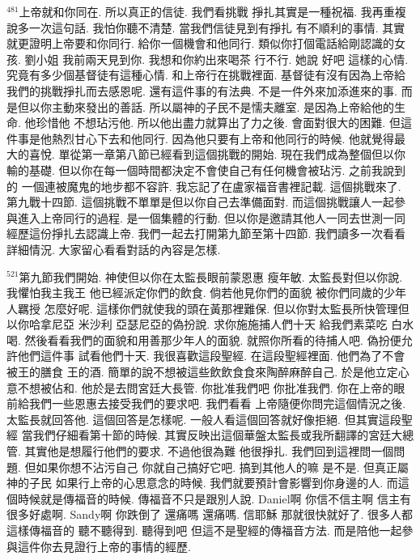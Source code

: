 \documentclass{book}
\begin{document}
$^{481}$上帝就和你同在.
所以真正的信徒.
我們看挑戰 掙扎其實是一種祝福.
我再重複說多一次這句話.
我怕你聽不清楚.
當我們信徒見到有掙扎 有不順利的事情.
其實就更證明上帝要和你同行.
給你一個機會和他同行.
類似你打個電話給剛認識的女孩.
劉小姐 我前兩天見到你.
我想和你約出來喝茶 行不行.
她說 好吧 這樣的心情.
究竟有多少個基督徒有這種心情.
和上帝行在挑戰裡面.
基督徒有沒有因為上帝給我們的挑戰掙扎而去感恩呢.
還有這件事的有法典.
不是一件外來加添進來的事.
而是但以你主動來發出的善話.
所以屬神的子民不是懦夫離室.
是因為上帝給他的生命.
他珍惜他 不想玷污他.
所以他出盡力就算出了力之後.
會面對很大的困難.
但這件事是他熱烈甘心下去和他同行.
因為他只要有上帝和他同行的時候.
他就覺得最大的喜悅.
單從第一章第八節已經看到這個挑戰的開始.
現在我們成為整個但以你輸的基礎.
但以你在每一個時間都決定不會使自己有任何機會被玷污.
之前我說到的 一個連被魔鬼的地步都不容許.
我忘記了在盧家福音書裡記載.
這個挑戰來了.
第九戰十四節.
這個挑戰不單單是但以你自己去準備面對.
而這個挑戰讓人一起參與進入上帝同行的過程.
是一個集體的行動.
但以你是邀請其他人一同去世測一同經歷這份掙扎去認識上帝.
我們一起去打開第九節至第十四節.
我們讀多一次看看詳細情況.
大家留心看看對話的內容是怎樣.

$^{521}$第九節我們開始.
神使但以你在太監長眼前蒙恩惠 瘦年敏.
太監長對但以你說.
我懼怕我主我王 他已經派定你們的飲食.
倘若他見你們的面貌 被你們同歲的少年人羈授 怎麼好呢.
這樣你們就使我的頭在黃那裡難保.
但以你對太監長所快管理但以你哈拿尼亞 米沙利 亞瑟尼亞的偽扮說.
求你施施捕人們十天 給我們素菜吃 白水喝.
然後看看我們的面貌和用善那少年人的面貌.
就照你所看的待捕人吧.
偽扮便允許他們這件事 試看他們十天.
我很喜歡這段聖經.
在這段聖經裡面.
他們為了不會被王的膳食 王的酒.
簡單的說不想被這些飲飲食食來陶醉麻醉自己.
於是他立定心意不想被佔和.
他於是去問宮廷大長管.
你批准我們吧 你批准我們.
你在上帝的眼前給我們一些恩惠去接受我們的要求吧.
我們看看 上帝隨便你問完這個情況之後.
太監長就回答他.
這個回答是怎樣呢.
一般人看這個回答就好像拒絕.
但其實這段聖經 當我們仔細看第十節的時候.
其實反映出這個華盤太監長或我所翻譯的宮廷大總管.
其實他是想履行他們的要求.
不過他很為難 他很掙扎.
我們回到這裡問一個問題.
但如果你想不沾污自己 你就自己搞好它吧.
搞到其他人的嘛 是不是.
但真正屬神的子民 如果行上帝的心思意念的時候.
我們就要預計會影響到你身邊的人.
而這個時候就是傳福音的時候.
傳福音不只是跟別人說.
Daniel啊 你信不信主啊 信主有很多好處啊.
Sandy啊 你跌倒了 還痛嗎 還痛嗎.
信耶穌 那就很快就好了.
很多人都這樣傳福音的 聽不聽得到.
聽得到吧 但這不是聖經的傳福音方法.
而是陪他一起參與這件你去見證行上帝的事情的經歷.
\end{document}
